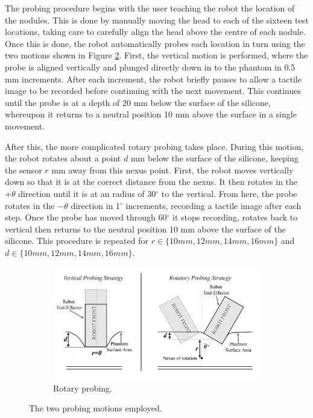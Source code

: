 \documentclass[]{interact}
\theoremstyle{plain}%
\theoremstyle{definition}
\theoremstyle{remark}
\newcommand{\degree}{$^{\circ}$ }
\begin{document}
The probing procedure begins with the user teaching the robot the location of the nodules. This is done by manually moving the head to each of the sixteen test locations, taking care to carefully align the head above the centre of each nodule. Once this is done, the robot automatically probes each location in turn using the two motions shown in Figure \ref{probing}. First, the vertical motion is performed, where the probe is aligned vertically and plunged directly down in to the phantom in 0.5 mm increments. After each increment, the robot briefly pauses to allow a tactile image to be recorded before continuing with the next movement. This continues until the probe is at a depth of 20 mm below the surface of the silicone, whereupon it returns to a neutral position 10 mm above the surface in a single movement.

After this, the more complicated rotary probing takes place. During this motion, the robot rotates about a point $d$ mm below the surface of the silicone, keeping the sensor $r$ mm away from this nexus point. First, the robot moves vertically down so that it is at the correct distance from the nexus. It then rotates in the $+\theta$ direction until it is at an radius of 30\degree to the vertical. From here, the probe rotates in the $-\theta$ direction in 1\degree increments, recording a tactile image after each step. Once the probe has moved through 60\degree it stops recording, rotates back to vertical then returns to the neutral position 10 mm above the surface of the silicone. This procedure is repeated for $r\in\lbrace 10 mm, 12 mm, 14 mm, 16 mm \rbrace$ and $d\in\lbrace 10 mm, 12 mm, 14 mm, 16 mm \rbrace$.

\begin{figure}[]
	\centering
	\begin{subfigure}[b]{0.64\textwidth}
		\includegraphics[width=\textwidth]{./figs/motion_diagram}
		\caption{Rotary probing.}
		\label{probing:rotate}
	\end{subfigure}
	\caption{The two probing motions employed.}
	\label{probing}
\end{figure}
\end{document}
